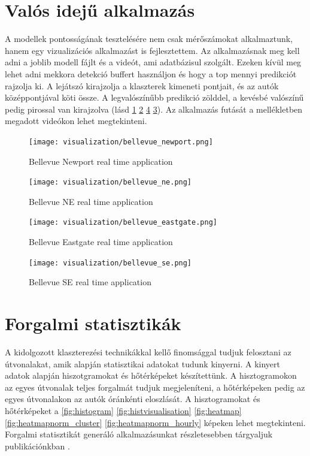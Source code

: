 \documentclass[12pt,a4paper]{article}
\begin{document}
\newpage
\section{Valós idejű alkalmazás}
A modellek pontosságának tesztelésére nem csak mérőszámokat alkalmaztunk, hanem egy vizualizációs alkalmazást is fejlesztettem. Az alkalmazásnak meg kell adni
a joblib modell fájlt és a videót, ami adatbázisul szolgált. Ezeken kívül meg lehet adni mekkora detekció buffert használjon és hogy a top mennyi predikciót rajzolja ki.
A lejátszó kirajzolja a klaszterek kimeneti pontjait, és az autók középpontjával köti össze. A legvalószínűbb predikció zölddel, a kevésbé valószínű pedig pirossal
van kirajzolva (lásd \ref{BellevueNewportRealTime} \ref{fig: BellevueNERealTime} \ref{fig: BellevueSERealTime} \ref{fig: BellevueEastgateRealTime}).
Az alkalmazás futását a mellékletben megadott videókon lehet megtekinteni.

\begin{figure}[htbp]
    \texttt{[image: visualization/bellevue\_newport.png]}
    \caption{Bellevue Newport real time application}
    \label{BellevueNewportRealTime}
\end{figure}

\begin{figure}[htbp]
    \texttt{[image: visualization/bellevue\_ne.png]}
    \caption{Bellevue NE real time application}
    \label{fig: BellevueNERealTime}
\end{figure}

\begin{figure}[htbp]
    \texttt{[image: visualization/bellevue\_eastgate.png]}
    \caption{Bellevue Eastgate real time application}
    \label{fig: BellevueEastgateRealTime}
\end{figure}

\begin{figure}[htbp]
    \texttt{[image: visualization/bellevue\_se.png]}
    \caption{Bellevue SE real time application}
    \label{fig: BellevueSERealTime}
\end{figure}

\newpage
\section{Forgalmi statisztikák}
A kidolgozott klaszterezési technikákkal kellő finomsággal tudjuk felosztani az útvonalakat, amik alapján statisztikai adatokat tudunk kinyerni.
A kinyert adatok alapján hiszotgramokat és hőtérképeket készítettünk. A hisztogramokon az egyes útvonalak teljes forgalmát tudjuk megjeleníteni,
a hőtérképeken pedig az egyes útvonalakon az autók óránkénti eloszlását. A hisztogramokat és hőtérképeket a \ref{fig:histogram} \ref{fig:histvisualisation} \ref{fig:heatmap} \ref{fig:heatmapnorm_cluster} \ref{fig:heatmapnorm_hourly} képeken lehet megtekinteni.
Forgalmi statisztikát generáló alkalmazásunkat részletesebben tárgyaljuk publikációnkban \cite{aggpeterhorvath2023}. %
\end{document}
